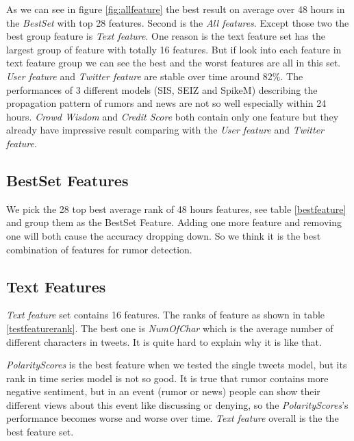  As we can see in figure \ref{fig:allfeature} the best result on average over 48 hours in the \emph{BestSet} with top 28 features. Second is the  \emph{All features}. Except those two the best group feature is \emph{Text feature}. One reason is the text feature set has the largest group of feature with totally 16 features. But if look into each feature in text feature group we can see the best and the worst features are all in this set. \emph{User feature} and \emph{Twitter feature} are stable over time around 82\%. The performances of 3 different models (SIS, SEIZ and SpikeM) describing the propagation pattern of rumors and news are not so well especially within 24 hours. \emph{Crowd Wisdom} and \emph{Credit Score} both contain only one feature but they already have impressive result comparing with the \emph{User feature} and \emph{Twitter feature}.
 \subsection{BestSet Features} 
 We pick the 28 top best average rank of 48 hours features, see table \ref{bestfeature} and group them as the BestSet Feature. Adding one more feature and removing one will both cause the accuracy dropping down. So we think it is the best combination of features for rumor detection.
 
 \subsection{Text Features} 
 \emph{Text feature} set contains 16 features. The ranks of feature as shown in table \ref{testfeaturerank}. The best one is \emph{NumOfChar} which is the average number of different characters in tweets. It is quite hard to explain why it is like that. 
 
 \emph{PolarityScores} is the best feature when we tested the single tweets model, but its rank in time series model is not so good.  It is true that rumor contains more negative sentiment, but in an event (rumor or news) people can show their different views about this event \cite{mendoza2010twitter} \cite{starbird2014rumors} like discussing or denying, so the \emph{ PolarityScores}'s performance becomes worse and worse over time. 
  \emph{Text feature} overall is the the best feature set.
 
